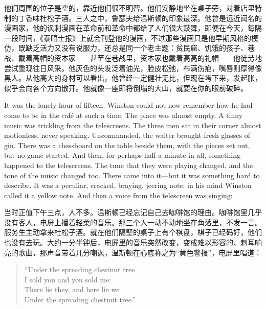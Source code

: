 \begin{paracol}{2}
\switchcolumn

他们周围的位子是空的，靠近他们很不明智。他们安静地坐在桌子旁，对着店里特制的丁香味杜松子酒。三人之中，鲁瑟夫给温斯顿的印象最深。他曾是远近闻名的漫画家，他的讽刺漫画在革命前和革命中都给了人们很大鼓舞，即便在今天，每隔一段时间，《泰晤士报》上就会刊登他的漫画，不过那些漫画只是他早期风格的模仿，既缺乏活力又没有说服力，还总是同一个老主题：贫民窟、饥饿的孩子、巷战、戴着高帽的资本家——甚至在巷战里，资本家也戴着高高的礼帽——他徒劳地尝试重现往日风采。他灰色的头发泛着油光，脸皮松弛，布满伤疤，嘴唇则厚得像黑人。从他高大的身材可以看出，他曾经一定健壮无比，但现在垮下来，发起胀，似乎会向各个方向散开。他就像一座即将倒塌的大山，就要在你的眼前破碎。

\switchcolumn*

It was the lonely hour of fifteen. Winston could not now remember how he
had come to be in the café at such a time. The place was almost empty. A
tinny music was trickling from the telescreens. The three men sat in
their corner almost motionless, never speaking. Uncommanded, the waiter
brought fresh glasses of gin. There was a chessboard on the table beside
them, with the pieces set out, but no game started. And then, for
perhaps half a minute in all, something happened to the telescreens. The
tune that they were playing changed, and the tone of the music changed
too. There came into it---but it was something hard to describe. It was
a peculiar, cracked, braying, jeering note; in his mind Winston called
it a yellow note. And then a voice from the telescreen was singing:

\switchcolumn

当时正值下午三点，人不多。温斯顿已经忘记自己去咖啡馆的理由。咖啡馆里几乎没有客人，电屏上播着轻柔的音乐。那三个人一动不动地坐在角落里，不发一言。服务生主动拿来杜松子酒。就在他们隔壁的桌子上有个棋盘，棋子已经码好，他们也没有去玩。大约一分半钟后，电屏里的音乐突然改变，变成难以形容的、刺耳响亮的歌曲，那声音带着几分嘲讽，温斯顿在心底称之为``黄色警报''，电屏里唱道：

\switchcolumn*

\begin{quotation}
  \noindent ``Under the spreading chestnut tree\\
  I sold you and you sold me:\\
  There lie they, and here lie we\\
  Under the spreading chestnut tree.''
\end{quotation}

\switchcolumn


\end{paracol}
